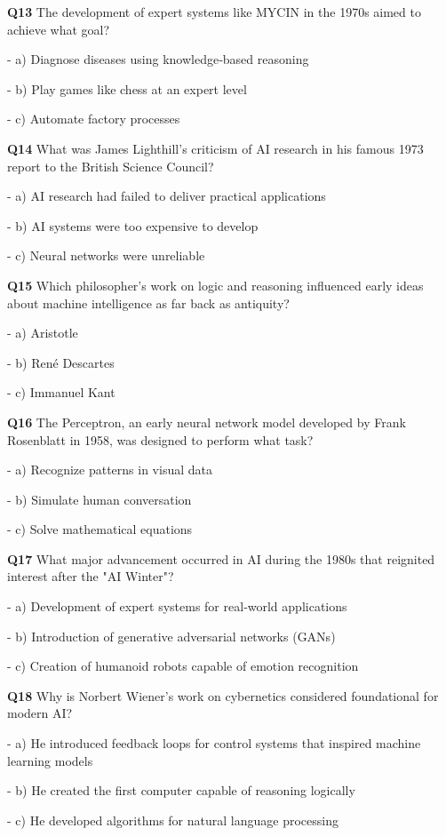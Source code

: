\textbf{Q13} The development of expert systems like MYCIN in the 1970s aimed to achieve what goal?\par
\quad - a) Diagnose diseases using knowledge‑based reasoning\par
\quad - b) Play games like chess at an expert level\par
\quad - c) Automate factory processes\par

\textbf{Q14} What was James Lighthill's criticism of AI research in his famous 1973 report to the British Science Council?\par
\quad - a) AI research had failed to deliver practical applications\par
\quad - b) AI systems were too expensive to develop\par
\quad - c) Neural networks were unreliable\par

\textbf{Q15} Which philosopher's work on logic and reasoning influenced early ideas about machine intelligence as far back as antiquity?\par
\quad - a) Aristotle\par
\quad - b) René Descartes\par
\quad - c) Immanuel Kant\par

\textbf{Q16} The Perceptron, an early neural network model developed by Frank Rosenblatt in 1958, was designed to perform what task?\par
\quad - a) Recognize patterns in visual data\par
\quad - b) Simulate human conversation\par
\quad - c) Solve mathematical equations\par

\textbf{Q17} What major advancement occurred in AI during the 1980s that reignited interest after the "AI Winter"?\par
\quad - a) Development of expert systems for real‑world applications\par
\quad - b) Introduction of generative adversarial networks (GANs)\par
\quad - c) Creation of humanoid robots capable of emotion recognition\par

\textbf{Q18} Why is Norbert Wiener's work on cybernetics considered foundational for modern AI?\par
\quad - a) He introduced feedback loops for control systems that inspired machine learning models\par
\quad - b) He created the first computer capable of reasoning logically\par
\quad - c) He developed algorithms for natural language processing\par

